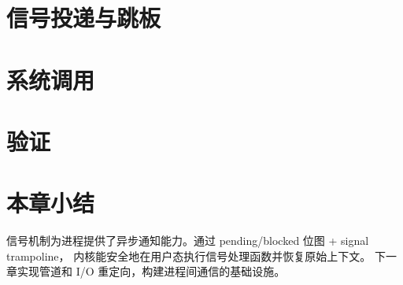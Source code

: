 
\section{信号投递与跳板}
\label{sec:sig-delivery}


\section{系统调用}
\label{sec:sig-syscall}


\section{验证}
\label{sec:sig-verify}


\section{本章小结}

信号机制为进程提供了异步通知能力。通过 pending/blocked 位图 + signal trampoline，
内核能安全地在用户态执行信号处理函数并恢复原始上下文。
下一章实现管道和 I/O 重定向，构建进程间通信的基础设施。
